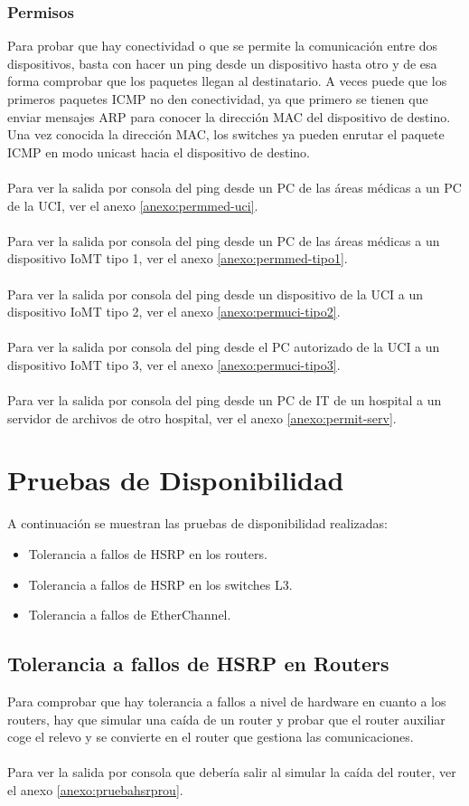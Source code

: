 \subsubsection{Permisos}
Para probar que hay conectividad o que se permite la comunicación entre dos dispositivos, basta con hacer un ping desde un dispositivo hasta otro y de esa forma comprobar que los paquetes llegan al destinatario. A veces puede que los primeros paquetes \ac{ICMP} no den conectividad, ya que primero se tienen que enviar mensajes ARP para conocer la dirección MAC 
del dispositivo de destino. Una vez conocida la dirección MAC, los switches ya pueden enrutar el paquete ICMP en modo unicast hacia el dispositivo de destino.
\\ \\ 
Para ver la salida por consola del ping desde un PC de las áreas médicas a un PC de la UCI, ver el anexo \ref{anexo:permmed-uci}.
\\ \\ 
Para ver la salida por consola del ping desde un PC de las áreas médicas a un dispositivo IoMT tipo 1, ver el anexo \ref{anexo:permmed-tipo1}.
\\ \\ 
Para ver la salida por consola del ping desde un dispositivo de la UCI a un dispositivo IoMT tipo 2, ver el anexo \ref{anexo:permuci-tipo2}.
\\ \\ 
Para ver la salida por consola del ping desde el PC autorizado de la UCI a un dispositivo IoMT tipo 3, ver el anexo \ref{anexo:permuci-tipo3}.
\\ \\ 
Para ver la salida por consola del ping desde un PC de IT de un hospital a un servidor de archivos de otro hospital, ver el anexo \ref{anexo:permit-serv}.

\section{Pruebas de Disponibilidad}
A continuación se muestran las pruebas de disponibilidad realizadas:
\begin{itemize}
    \item Tolerancia a fallos de HSRP en los routers.
    \item Tolerancia a fallos de HSRP en los switches L3.
    \item Tolerancia a fallos de EtherChannel.
\end{itemize}

\subsection{Tolerancia a fallos de HSRP en Routers}
Para comprobar que hay tolerancia a fallos a nivel de hardware en cuanto a los routers, hay que simular una caída de un router y probar que el router auxiliar coge el relevo y se convierte en 
el router que gestiona las comunicaciones.
\\ \\ 
Para ver la salida por consola que debería salir al simular la caída del router, ver el anexo \ref{anexo:pruebahsrprou}.

